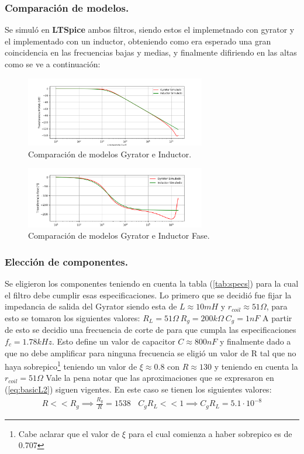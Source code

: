 \documentclass[a4paper]{article}
\begin{document}
\subsubsection{Comparación de modelos.}
Se simuló en \textbf{LTSpice} ambos filtros, siendo estos el implemetnado con gyrator y el implementado con un inductor, obteniendo como era esperado una gran coincidencia en las frecuencias bajas y medias, y finalmente difiriendo en las altas como se ve a continuación:
\begin{figure}[H]	
	\centering
	\includegraphics[width=0.7\textwidth]{ImagenesEj2/simLP.PNG}
	\caption{Comparación de modelos Gyrator e Inductor.}
	\label{fig:gyrIndL}
\end{figure}
\begin{figure}[H]	
	\centering
	\includegraphics[width=0.7\textwidth]{ImagenesEj2/simLPP.PNG}
	\caption{Comparación de modelos Gyrator e Inductor Fase.}
	\label{fig:gyrIndPL}
\end{figure}
\subsubsection{Elección de componentes.}
Se eligieron los componentes teniendo en cuenta la tabla (\ref{tab:specs}) para la cual el filtro debe cumplir esas especificaciones.
Lo primero que se decidió fue fijar la impedancia de salida del Gyrator siendo esta de $L \approx 10mH $ y $r_{coil} \approx 51\Omega $, para esto se tomaron los siguientes valores: $R_L = 51\Omega \ R_g = 200k\Omega \ C_g = 1nF$
A partir de esto se decidio una frecuencia de corte de  para que cumpla las especificaciones $f_c =1.78kHz $. Esto define un valor de capacitor $C \approx 800nF$ y finalmente dado a que no debe amplificar para ninguna frecuencia se eligió un valor de R tal que no haya sobrepico\footnote{Cabe aclarar que el valor de $\xi$ para el cual comienza a haber sobrepico es de 0.707} teniendo un valor de $\xi \approx 0.8 $ con $R \approx 130 $ y teniendo en cuenta la $r_{coil} = 51\Omega$  
Vale la pena notar que las aproximaciones que se expresaron en (\ref{eq:basicL2}) siguen vigentes. En este caso se tienen los siguientes valores:
\begin{align}  R<<R_g \implies  \frac{R_g}{R}=  1538 \ \ \ \ C_gR_L << 1 \implies C_gR_L =5.1\cdot 10^{-8} \end{align}
\end{document}

